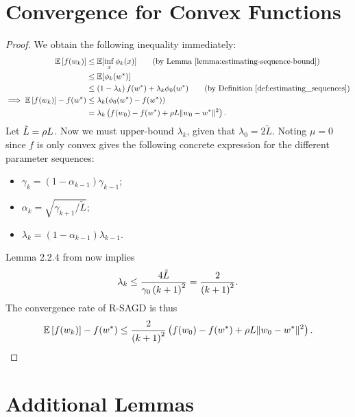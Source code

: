 \section{Convergence for Convex Functions}\label{app:agd-convex}

\convexAGD*
\begin{proof}
    We obtain the following inequality immediately:
    \begin{align*}
        \E\sbr{f(\wk)} &\leq \E[\inf_x \phi_k(x)] \tag{by Lemma~\ref{lemma:estimating-sequence-bound}}\\
        &\leq \E[\phi_k(\wopt)] \\
        &\leq \rbr{1 - \lambda_k} f(\wopt) + \lambda_k \phi_0(\wopt) \tag{by Definition~\ref{def:estimating_sequences}}\\
        \implies \E\sbr{f(\wk)} - f(\wopt) &\leq \lambda_k (\phi_0(\wopt) - f(\wopt))\\
                                           &= \lambda_k \rbr{f(\w_0) - f(\wopt) + \sgc L \norm{\w_0 - \wopt}^2 }.
    \end{align*}
    Let \( \tilde L = \rho L \). 
    Now we must upper-bound \( \lambda_k \), given that \( \lambda_0 = 2 \tilde L \).
    Noting \( \mu = 0 \) since \( f \) is only convex gives the following concrete expression for the different parameter sequences: 
    \begin{itemize}
        \item \(  \gamma_{k}  = (1 - \alpha_{k-1}) \gamma_{k-1} \);
        \item \( \alpha_{k} = \sqrt{\gamma_{k+1} / \tilde L} \);
        \item \( \lambda_{k} = (1 - \alpha_{k-1}) \lambda_{k-1} \).
    \end{itemize}
    Lemma 2.2.4 from \citet{nesterov2004lectures} now implies 
    \[ \lambda_k \leq \frac{4 \tilde L}{\gamma_0 \left(k + 1\right)^2} = \frac{2}{\left(k + 1\right)^2}. \]
    The convergence rate of R-SAGD is thus 
    \[  \mathbb{E}\left[f(w_k)\right] - f(w^*) \leq \frac{2}{\left(k+1\right)^2}\left(f(w_0) - f(w^*) + \rho L \|w_0 - w^*\|^2 \right). \]
\end{proof}

\newpage

\section{Additional Lemmas}\label{app:agd-additional-lemmas}

